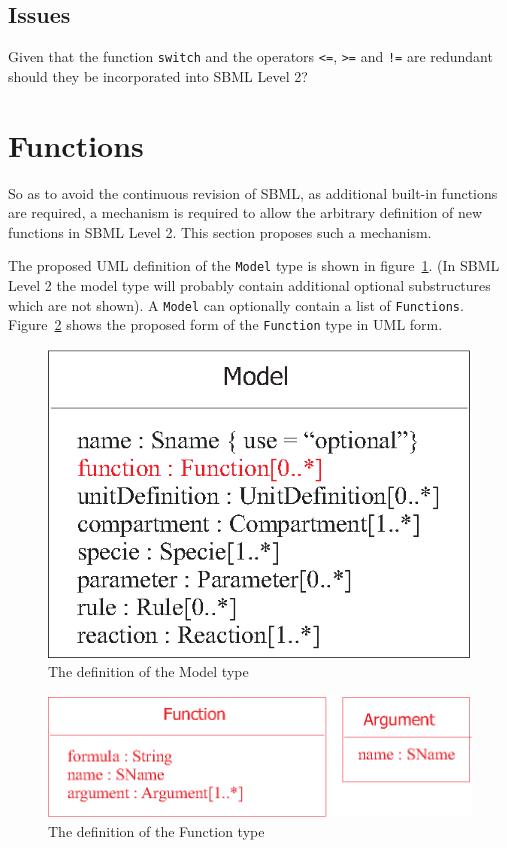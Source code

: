 \documentclass{cekarticle}
\begin{document}
\subsection{Issues}

Given that the function \texttt{switch} and the operators
\texttt{<=}, \texttt{>=} and \texttt{!=} are redundant should
they be incorporated into SBML Level 2?

\section{Functions}
\label{sec:functions}

So as to avoid the continuous revision of SBML, as additional
built-in functions are required, a mechanism is required to allow
the arbitrary definition of new functions in SBML Level 2. This
section proposes such a mechanism.

The proposed UML definition of the \texttt{Model} type is shown in
figure~\ref{fig:model}. (In SBML Level 2 the model type will
probably contain additional optional substructures which are not
shown).  A \texttt{Model} can optionally contain a list of
\texttt{Functions}. Figure~\ref{fig:function} shows the proposed
form of the \texttt{Function} type in UML form.

\begin{figure}[h]
  \vspace*{8pt}
  \centering
  \includegraphics[scale = 0.7]{model}
  \caption{The definition of the Model type}
  \label{fig:model}
\end{figure}

\begin{figure}[h]
  \vspace*{8pt}
  \centering
  \includegraphics[scale = 0.7]{function}
  \caption{The definition of the Function type}
  \label{fig:function}
\end{figure}
\end{document}
